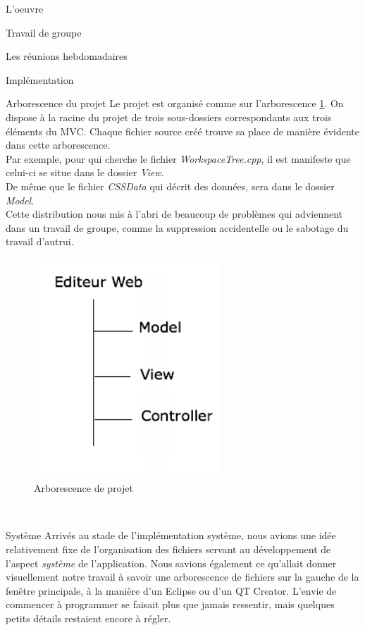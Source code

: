 \documentclass[a4paper, 12pt]{report}
\begin{document}
\begin{part}{L'oeuvre}
\begin{chapter}{Travail de groupe}
\begin{section}{Les réunions hebdomadaires}
			\end{section}
		\end{chapter}
		\begin{chapter}{Implémentation}
			\begin{section}{Arborescence du projet}
				Le projet est organisé comme sur l'arborescence \ref{dindon}. On dispose à la racine du projet de trois sous-dossiers correspondants
				aux trois éléments du \gls{MVC}. Chaque fichier source créé trouve sa place de manière évidente dans cette arborescence.\\
				Par exemple, pour qui cherche le fichier \emph{WorkspaceTree.cpp}, il est manifeste que celui-ci se situe dans le dossier \emph{View}.
				\\
				De même que le fichier \emph{CSSData} qui décrit des données, sera dans le dossier \emph{Model}.\\
				Cette distribution nous mis à l'abri de beaucoup de problèmes qui adviennent dans un travail de groupe, comme la suppression
				accidentelle ou le sabotage du travail d'autrui.\\

				\begin{figure}[h]
					\begin{center}
						\includegraphics[width=7cm]{images/arborescenceProjet.png}
						\caption{Arborescence de projet}
						\label{dindon}
					\end{center}
				\end{figure}~\\
			\end{section}
			\begin{section}{Système}
			\label{calebasse}
				Arrivés au stade de l'implémentation système, nous avions une idée relativement fixe de l'organisation des fichiers servant au
				développement de l'aspect \emph{système} de l'application. Nous savions également ce qu'allait donner visuellement notre travail
				à savoir une arborescence de fichiers sur la gauche de la fenêtre principale, à la manière d'un Eclipse ou d'un QT Creator.
				L'envie de commencer à programmer se faisait plus que jamais ressentir, mais quelques petits détails restaient encore à régler.\\



\end{section}
\end{chapter}
\end{part}
\end{document}
